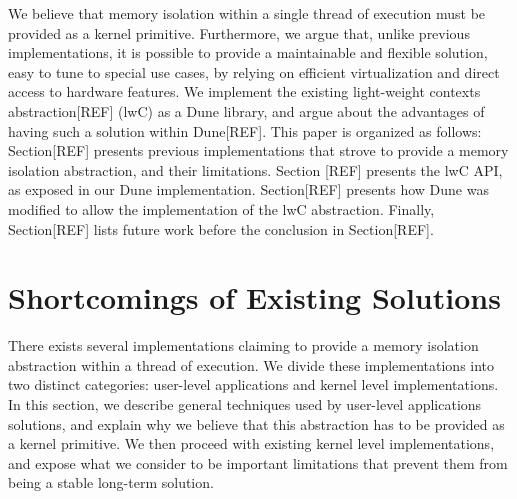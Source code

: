 \documentclass[letterpaper,twocolumn,10pt]{article}
\begin{document}
We believe that memory isolation within a single thread of execution must be provided as a kernel primitive.
Furthermore, we argue that, unlike previous implementations, it is possible to provide a maintainable and flexible solution, easy to tune to special use cases, by relying on efficient virtualization and direct access to hardware features.
We implement the existing light-weight contexts abstraction[REF] (lwC) as a Dune library, and argue about the advantages of having such a solution within Dune[REF].
This paper is organized as follows: Section[REF] presents previous implementations that strove to provide a memory isolation abstraction, and their limitations.
Section [REF] presents the lwC API, as exposed in our Dune implementation.
Section[REF] presents how Dune was modified to allow the implementation of the lwC abstraction.
Finally, Section[REF] lists future work before the conclusion in Section[REF].


%

\section{Shortcomings of Existing Solutions}
There exists several implementations claiming to provide a memory isolation abstraction within a thread of execution.
We divide these implementations into two distinct categories: user-level applications and kernel level implementations.
In this section, we describe general techniques used by user-level applications solutions, and explain why we believe that this abstraction has to be provided as a kernel primitive.
We then proceed with existing kernel level implementations, and expose what we consider to be important limitations that prevent them from being a stable long-term solution.\\
\end{document}
